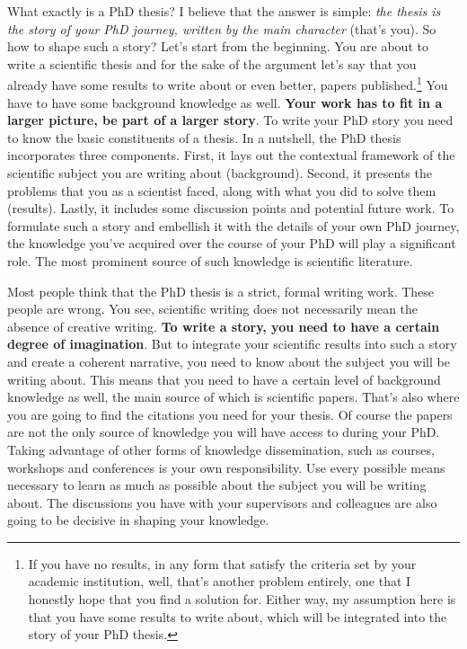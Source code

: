 \documentclass[
  12pt,
  oneside]{book}
\begin{document}
What exactly is a PhD thesis?
I believe that the answer is simple: \emph{the thesis is the story of your PhD journey, written by the main character} (that's you).
So how to shape such a story?
Let's start from the beginning.
You are about to write a scientific thesis and for the sake of the argument let's say that you already have some results to write about or even better, papers published.\footnote{If you have no results, in any form that satisfy the criteria set by your academic institution, well, that's another problem entirely, one that I honestly hope that you find a solution for. Either way, my assumption here is that you have some results to write about, which will be integrated into the story of your PhD thesis.}
You have to have some background knowledge as well.
\textbf{Your work has to fit in a larger picture, be part of a larger story}.
To write your PhD story you need to know the basic constituents of a thesis.
In a nutshell, the PhD thesis incorporates three components.
First, it lays out the contextual framework of the scientific subject you are writing about (background).
Second, it presents the problems that you as a scientist faced, along with what you did to solve them (results).
Lastly, it includes some discussion points and potential future work.
To formulate such a story and embellish it with the details of your own PhD journey, the knowledge you've acquired over the course of your PhD will play a significant role.
The most prominent source of such knowledge is scientific literature.

Most people think that the PhD thesis is a strict, formal writing work.
These people are wrong.
You see, scientific writing does not necessarily mean the absence of creative writing.
\textbf{To write a story, you need to have a certain degree of imagination}.
But to integrate your scientific results into such a story and create a coherent narrative, you need to know about the subject you will be writing about.
This means that you need to have a certain level of background knowledge as well, the main source of which is scientific papers.
That's also where you are going to find the citations you need for your thesis.
Of course the papers are not the only source of knowledge you will have access to during your PhD.
Taking advantage of other forms of knowledge dissemination, such as courses, workshops and conferences is your own responsibility.
Use every possible means necessary to learn as much as possible about the subject you will be writing about.
The discussions you have with your supervisors and colleagues are also going to be decisive in shaping your knowledge.
\end{document}
